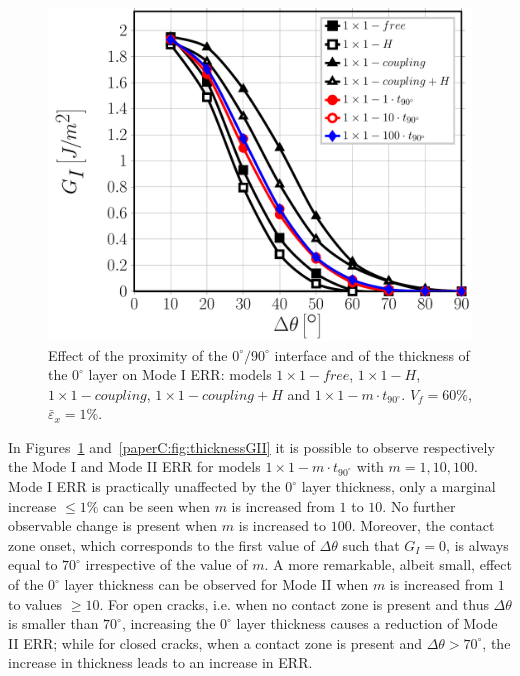 \begin{figure}[!htb]
\centering
\includegraphics[width=\textwidth]{paperC/1x1-i-vf60-GI.pdf}
\caption{Effect of the proximity of the $0^{\circ}/90^{\circ}$ interface and of the thickness of the $0^{\circ}$ layer on Mode I ERR: models $1\times 1-free$, $1\times 1-H$, $1\times 1-coupling$, $1\times 1-coupling+H$ and $1\times 1-m\cdot t_{90^{\circ}}$. $V_{f}=60\%$, $\bar{\varepsilon}_{x}=1\%$.}\label{paperC:fig:thicknessGI}
\end{figure}

In Figures~\ref{paperC:fig:thicknessGI} and~\ref{paperC:fig:thicknessGII} it is possible to observe respectively the Mode I and Mode II ERR for models $1\times 1-m\cdot t_{90^{\circ}}$ with $m=1,10,100$. Mode I ERR is practically unaffected by the $0^{\circ}$ layer thickness, only a marginal increase $\leq1\%$ can be seen when $m$ is increased from $1$ to $10$. No further observable change is present when $m$ is increased to $100$. Moreover, the contact zone onset, which corresponds to the first value of $\Delta\theta$ such that $G_{I}=0$, is always equal to $70^{\circ}$ irrespective of the value of $m$. A more remarkable, albeit small, effect of the $0^{\circ}$ layer thickness can be observed for Mode II when $m$ is increased from $1$ to values $\geq10$. For open cracks, i.e. when no contact zone is present and thus $\Delta\theta$ is smaller than $70^{\circ}$, increasing the $0^{\circ}$ layer thickness causes a reduction of Mode II ERR; while for closed cracks, when a contact zone is present and $\Delta\theta>70^{\circ}$, the increase in thickness leads to an increase in ERR.\\

